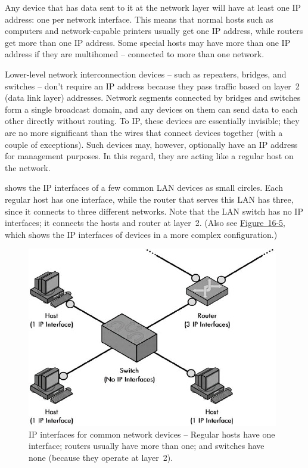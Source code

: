 Any device that has data sent to it at the network layer will have at
least one IP address: one per network interface. This means that normal
hosts such as computers and network-capable printers usually get one IP
address, while routers get more than one IP address. Some special hosts
may have more than one IP address if they are multihomed -- connected to
more than one network.

Lower-level network interconnection devices -- such as repeaters,
bridges, and switches -- don't require an IP address because they pass
traffic based on layer~2 (data link layer) addresses. Network segments
connected by bridges and switches form a single broadcast domain, and
any devices on them can send data to each other directly without
routing. To IP, these devices are essentially invisible; they are no
more significant than the wires that connect devices together (with a
couple of exceptions). Such devices may, however, optionally have an IP
address for management purposes. In this regard, they are acting like a
regular host on the network.

 shows the IP interfaces of a few common LAN devices as small circles.
Each regular host has one interface, while the router that serves this LAN has three, since it connects to three different networks.
Note that the LAN switch has no IP interfaces; it connects the hosts and router at layer~2.
(Also see \protect\hyperlink{ch16s06.htmlux5cux23multihomed_devices_on_an_ip_internetwork}{Figure~16-5}, which shows the IP interfaces of devices in a more complex configuration.)


\begin{figure}
   \centering
   \includegraphics[width=.6\textwidth]{images/ip-interfaces.jpg}
   \caption{IP interfaces for common network devices -- Regular hosts have one interface; routers usually have more than one; and switches have none (because they operate at layer~2).}
   \label{fig:ip-interfaces}
\end{figure}



